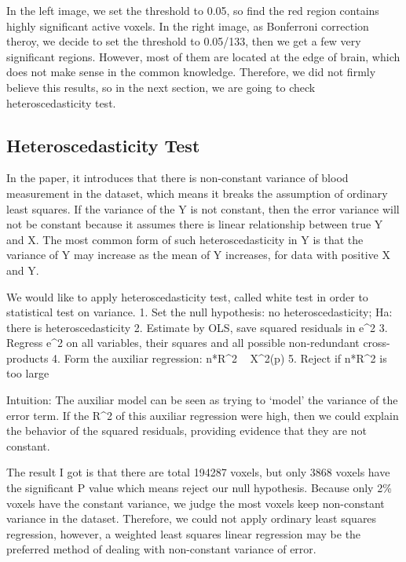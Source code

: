 In the left image, we set the threshold to 0.05, so find the red region contains
highly significant active voxels. In the right image, as Bonferroni correction
theroy, we decide to set the threshold to 0.05/133, then we get a few very 
significant regions. However, most of them are located at the edge of brain, 
which does not make sense in the common knowledge. Therefore, we did not firmly
believe this results, so in the next section, we are going to check heteroscedasticity
test.

\subsection{Heteroscedasticity Test}
In the paper, it introduces that there is non-constant variance of blood 
measurement in the dataset, which means it breaks the assumption of ordinary 
least squares. If the variance of the Y is not constant, then the error variance
will not be constant because it assumes there is linear relationship between 
true Y and X. The most common form of such heteroscedasticity in Y is that the 
variance of Y may increase as the mean of Y increases, for data with positive X
and Y.

We would like to apply heteroscedasticity test, called white test in order to 
statistical test on variance.
1. Set the null hypothesis: no heteroscedasticity; Ha: there is heteroscedasticity
2. Estimate by OLS, save squared residuals in e^2
3. Regress e^2 on all variables, their squares and all possible non-redundant cross-products
4. Form the auxiliar regression: n*R^2 ~ X^2(p)
5. Reject if n*R^2 is too large

Intuition: The auxiliar model can be seen as trying to ‘model’ the variance of 
the error term. If the R^2 of this auxiliar regression were high, then we could
explain the behavior of the squared residuals, providing evidence that they are
not constant.

The result I got is that there are total 194287 voxels, but only 3868 voxels 
have the significant P value which means reject our null hypothesis. Because 
only 2\% voxels have the constant variance, we judge the most voxels keep 
non-constant variance in the dataset. Therefore, we could not apply ordinary 
least squares regression, however, a weighted least squares linear regression 
may be the preferred method of dealing with non-constant variance of error.

